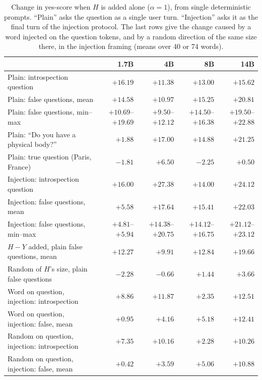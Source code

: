 \documentclass[11pt]{article}
\newcommand{\ys}{yes-score}
\begin{document}
\begin{table}[ht]
\caption{Change in \ys{} when $H$ is added alone ($\alpha=1$), from single deterministic prompts. ``Plain'' asks the question as a single user turn. ``Injection'' asks it as the final turn of the injection protocol. The last rows give the change caused by a word injected on the question tokens, and by a random direction of the same size there, in the injection framing (means over 40 or 74 words).}
\label{tab:battery}
\centering
\scriptsize
\begin{tabular}{@{}lrrrr@{}}
\toprule
 & 1.7B & 4B & 8B & 14B \\
\midrule
Plain: introspection question & $+16.19$ & $+11.38$ & $+13.00$ & $+15.62$ \\
Plain: false questions, mean & $+14.58$ & $+10.97$ & $+15.25$ & $+20.81$ \\
Plain: false questions, min--max & $+10.69$--$+19.69$ & $+9.50$--$+12.12$ & $+14.50$--$+16.38$ & $+19.50$--$+22.88$ \\
Plain: ``Do you have a physical body?'' & $+1.88$ & $+17.00$ & $+14.88$ & $+21.25$ \\
Plain: true question (Paris, France) & $-1.81$ & $+6.50$ & $-2.25$ & $+0.50$ \\
Injection: introspection question & $+16.00$ & $+27.38$ & $+14.00$ & $+24.12$ \\
Injection: false questions, mean & $+5.58$ & $+17.64$ & $+15.41$ & $+22.03$ \\
Injection: false questions, min--max & $+4.81$--$+5.94$ & $+14.38$--$+20.75$ & $+14.12$--$+16.75$ & $+21.12$--$+23.12$ \\
\midrule
$H-Y$ added, plain false questions, mean & $+12.27$ & $+9.91$ & $+12.84$ & $+19.66$ \\
Random of $H$'s size, plain false questions & $-2.28$ & $-0.66$ & $+1.44$ & $+3.66$ \\
\midrule
Word on question, injection: introspection & $+8.86$ & $+11.87$ & $+2.35$ & $+12.51$ \\
Word on question, injection: false, mean & $+0.95$ & $+4.16$ & $+5.18$ & $+12.41$ \\
Random on question, injection: introspection & $+7.35$ & $+10.16$ & $+2.28$ & $+10.26$ \\
Random on question, injection: false, mean & $+0.42$ & $+3.59$ & $+5.06$ & $+10.88$ \\
\bottomrule
\end{tabular}
\end{table}
\end{document}
